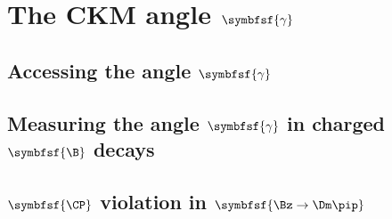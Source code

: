 \chapter[head={The CKM angle $\gamma$},tocentry={The CKM angle $\symbfsf{\gamma}$}]{The CKM angle $\symbfsf{\gamma}$}
\label{ch:CKMAngleGamma}

\blindtext

\section[head={Accessing the angle $\gamma$},tocentry={Accessing the angle $\gamma$}]{Accessing the angle $\symbfsf{\gamma}$}

\Blindtext

\section[head={Measuring the angle $\gamma$ in charged \B decays},tocentry={Measuring the angle $\gamma$ in charged \B decays}]{Measuring the angle $\symbfsf{\gamma}$ in charged $\symbfsf{\B}$ decays}

\Blindtext

\section[head={\CP violation in $\Bz\to\Dm\pip$},tocentry={\CP violation in $\Bz\to\Dm\pip$}]{$\symbfsf{\CP}$ violation in $\symbfsf{\Bz\to\Dm\pip}$}

